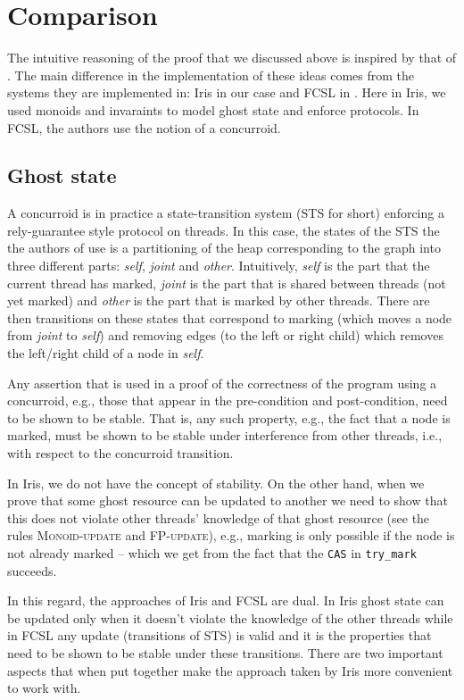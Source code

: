\documentclass[]{scrartcl}
\def\MyMLe{\lstinline[language=MyML, basicstyle=\small\ttfamily, mathescape=true]}
\begin{document}
\section{Comparison}
The intuitive reasoning of the proof that we discussed above is inspired by that of \cite{Sergey:2015:MVF:2737924.2737964}.
The main difference in the implementation of these ideas comes from the
systems they are implemented in: Iris in our case and FCSL in \cite{Sergey:2015:MVF:2737924.2737964}.
Here in Iris, we used monoids and invaraints to model ghost state and
enforce protocols.
In FCSL, the authors use the notion of a concurroid.

\subsection{Ghost state}
A concurroid is in practice a state-transition system (STS for short)
enforcing a rely-guarantee style protocol on threads.
In this case, the states of the STS the the authors of \cite{Sergey:2015:MVF:2737924.2737964} use is a partitioning of the
heap corresponding to the graph into three different parts:
\textit{self}, \textit{joint} and \textit{other}.
Intuitively, \textit{self} is the part that the current thread has marked,
\textit{joint} is the part that is shared between threads (not yet marked)
and \textit{other} is the part that is marked by other threads.
There are then transitions on these states that correspond to marking
(which moves a node from \textit{joint} to \textit{self}) and removing
edges (to the left or right child) which removes the left/right child of a
node in \textit{self}.

Any assertion that is used in a proof of the correctness of the program
using a concurroid, e.g., those that appear in the pre-condition and post-condition,
need to be shown to be stable.
That is, any such property, e.g., the fact that a node is marked, must be
shown to be stable under interference from other threads, i.e., with
respect to the concurroid transition.

In Iris, we do not have the concept of stability.
On the other hand, when we prove that some ghost resource can be
updated to another we need to show that this does not violate other
threads' knowledge of that ghost resource
(see the rules \textsc{Monoid-update} and \textsc{FP-update}), e.g., marking is only possible
if the node is not already marked -- which we get from the fact that the \MyMLe|CAS| in \MyMLe|try_mark| succeeds.

In this regard, the approaches of Iris and FCSL are dual.
In Iris ghost state can be updated only when it doesn't violate the knowledge
of the other threads while in FCSL any update (transitions of STS) is valid
and it is the properties that need to be shown to be stable under these transitions.
There are two important aspects that when put together make the approach taken by Iris
more convenient to work with.
\end{document}
